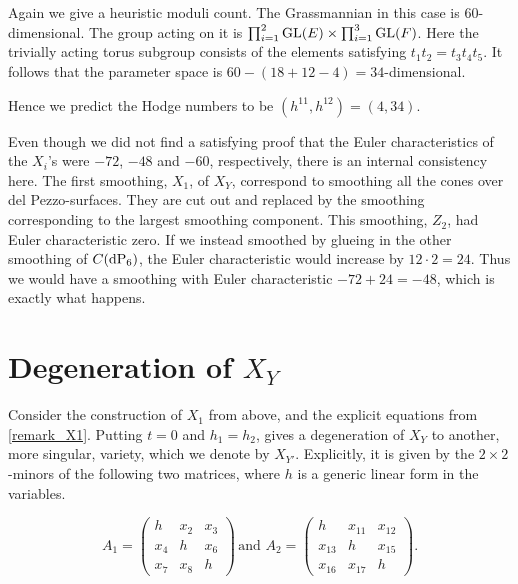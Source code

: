 \begin{remark}
Again we give a heuristic moduli count. The Grassmannian in this case is $60$-dimensional. The group acting on it is $\prod^2_{i=1} \operatorname{GL}(E) \times \prod^3_{i=1} \operatorname{GL}(F)$. Here the trivially acting torus subgroup consists of the elements satisfying $t_1t_2=t_3t_4t_5$. It follows that the parameter space is $60-(18+12-4)=34$-dimensional.

Hence we predict the Hodge numbers to be $(h^{11},h^{12})=(4,34)$.
\end{remark}

\begin{remark}
Even though we did not find a satisfying proof that the Euler characteristics of the $X_i$'s were $-72$, $-48$ and $-60$, respectively, there is an internal consistency here. The first smoothing, $X_1$, of $X_Y$, correspond to smoothing all the cones over del Pezzo-surfaces. They are cut out and replaced by the smoothing corresponding to the largest smoothing component. This smoothing, $Z_2$, had Euler characteristic zero. If we instead smoothed by glueing in the other smoothing of $C(\dP6)$, the Euler characteristic would increase by $12 \cdot 2=24$. Thus we would have a smoothing with Euler characteristic $-72+24=-48$, which is exactly what happens.
\end{remark}

\section{Degeneration of $X_Y$}
\label{sec:degenjoin}

Consider the construction of $X_1$ from above, and the explicit equations from \cref{remark_X1}. Putting $t=0$ and $h_1=h_2$, gives a degeneration of $X_Y$ to another, more singular, variety, which we denote by $X_{Y'}$. Explicitly, it is given by the $2 \times 2$-minors of the following two matrices, where $h$ is a generic linear form in the variables.

\[
A_1 = \begin{pmatrix}
h   & x_2 & x_3 \\
x_4 & h  & x_6 \\
x_7 & x_8 & h
\end{pmatrix}\,
\text{and }
A_2 = \begin{pmatrix}
h & x_{11} & x_{12} \\
x_{13} & h & x_{15} \\
x_{16} & x_{17} & h
\end{pmatrix}.
\]

